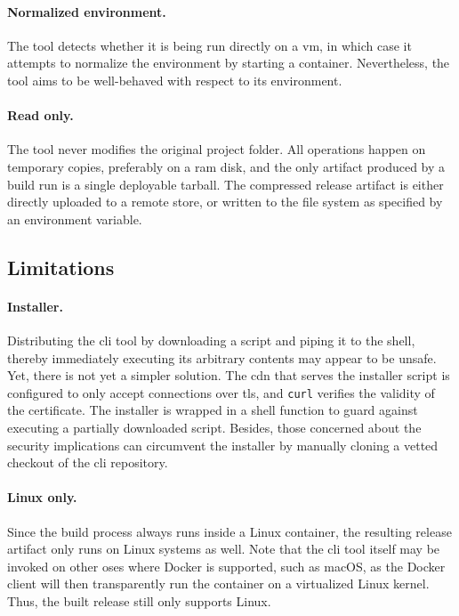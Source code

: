 \paragraph{Normalized environment.} The tool detects whether it is being run directly on a \acrshort{vm}, in which case it attempts to normalize the environment by starting a container. Nevertheless, the tool aims to be well-behaved with respect to its environment.

\paragraph{Read only.} The tool never modifies the original project folder. All operations happen on temporary copies, preferably on a \acrshort{ram} disk, and the only artifact produced by a build run is a single deployable tarball. The compressed release artifact is either directly uploaded to a remote store, or written to the file system as specified by an environment variable.

\cleardoublepage
\subsection{Limitations}

\paragraph{Installer.}\label{sec:curlpipesh} Distributing the \acrshort{cli} tool by downloading a script and piping it to the shell, thereby immediately executing its arbitrary contents may appear to be unsafe. Yet, there is not yet a simpler solution. The \acrshort{cdn} that serves the installer script is configured to only accept connections over \acrshort{tls}, and \lstinline|curl| verifies the validity of the certificate. The installer is wrapped in a shell function to guard against executing a partially downloaded script. Besides, those concerned about the security implications can circumvent the installer by manually cloning a vetted checkout of the \acrshort{cli} repository.

\paragraph{Linux only.} Since the build process always runs inside a Linux container, the resulting release artifact only runs on Linux systems as well. Note that the \acrshort{cli} tool itself may be invoked on other \acrshort{os}es where Docker is supported, such as macOS, as the Docker client will then transparently run the container on a virtualized Linux kernel.\cite{docker:docs} Thus, the built release still only supports Linux.

